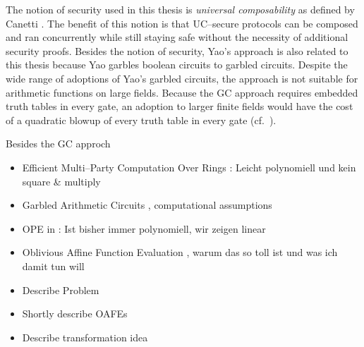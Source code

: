 The notion of security used in this thesis is \emph{universal composability} as
defined by Canetti \cite{canetti05}. The benefit of this notion is that
UC--secure protocols can be composed and ran concurrently while still staying
safe without the necessity of additional security proofs. Besides the notion of
security, Yao's  approach \cite{yao86} is also
related to this thesis because Yao garbles boolean circuits to garbled circuits.
Despite the wide range of adoptions of Yao's garbled circuits, the approach is
not suitable for arithmetic functions on large fields. Because the GC approach
requires embedded truth tables in every gate, an adoption to larger finite
fields would have the cost of a quadratic blowup of every truth table in every
gate (cf.\ \cite{naor99privacy}).

Besides the GC approch

\begin{itemize}
  \item Efficient Multi--Party Computation Over Rings \cite{cramer03}: Leicht
    polynomiell und kein square \& multiply

  \item Garbled Arithmetic Circuits \cite{gac2012}, computational assumptions

  \item OPE in \cite{naor99,naor06}: Ist bisher immer polynomiell, wir zeigen
    linear

  \item Oblivious Affine Function Evaluation \cite{davidgoliath}, warum das so
    toll ist und was ich damit tun will

\end{itemize}



\begin{itemize}

  \item Describe Problem

  \item Shortly describe OAFEs

  \item Describe transformation idea

\end{itemize}

